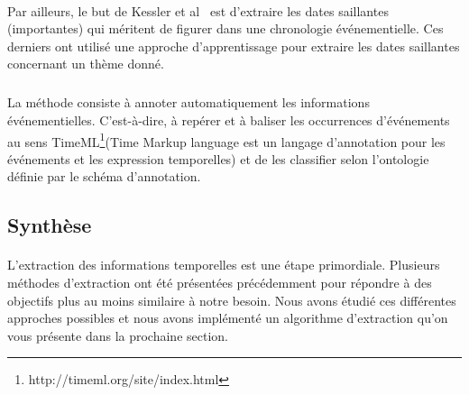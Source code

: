 \documentclass[12pt,a4]{report}
\begin{document}
\paragraph{}
Par ailleurs, le but de Kessler et al~\cite{kessler2013} est d'extraire les dates saillantes (importantes) qui méritent de figurer dans une chronologie événementielle.
Ces derniers ont utilisé une approche d’apprentissage pour extraire les dates saillantes concernant un thème donné.
\subparagraph{}
La méthode consiste à annoter automatiquement les informations événementielles. C’est-à-dire, à  repérer et à baliser les occurrences d’événements au sens TimeML\footnote{http://timeml.org/site/index.html}(Time Markup language est un langage d'annotation pour les événements et les expression temporelles) et de les classifier selon l’ontologie définie par le schéma d’annotation.
\subsection{Synthèse}
\paragraph{}
L'extraction des informations temporelles est une étape primordiale. Plusieurs méthodes d'extraction ont été présentées précédemment pour répondre à des objectifs plus au moins similaire à notre besoin. Nous avons étudié ces différentes approches possibles et nous avons implémenté un algorithme d'extraction qu'on vous présente dans la prochaine section.


\printglossary[title=Glossaire]
\end{document}
